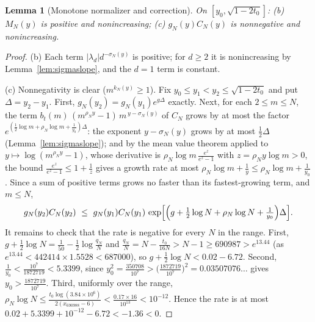 \documentclass[11pt]{article}
\newtheorem{lemma}[theorem]{Lemma}
\theoremstyle{definition}
\begin{document}
\begin{lemma}[Monotone normalizer and correction]\label{lem:bc}
On $[y_0,\sqrt{1-2t_0}]$: \textup{(b)} $M_N(y)$ is positive and
nonincreasing; \textup{(c)} $g_N(y)C_N(y)$ is nonnegative and
nonincreasing.
\end{lemma}

\begin{proof}
(b) Each term $|\lambda_d|d^{-\sigma_N(y)}$ is positive; for
$d\ge2$ it is nonincreasing by Lemma~\ref{lem:sigmaslope}, and the
$d=1$ term is constant.

(c) Nonnegativity is clear ($m^{k_N(y)}\ge1$). Fix
$y_0\le y_1<y_2\le\sqrt{1-2t_0}$ and put $\Delta=y_2-y_1$. First,
$g_N(y_2)=g_N(y_1)e^{g\Delta}$ exactly. Next, for each
$2\le m\le N$, the term
$b_t(m)\,(m^{\rho_Ny}-1)\,m^{\,y-\sigma_N(y)}$ of $C_N$ grows by at
most the factor $e^{(\frac12\log m+\rho_N\log m+\frac1{y_0})\Delta}$:
the exponent $y-\sigma_N(y)$ grows by at most $\frac12\Delta$
(Lemma~\ref{lem:sigmaslope}); and by the mean value theorem applied
to $y\mapsto\log(m^{\rho_Ny}-1)$, whose derivative is
$\rho_N\log m\,\frac{e^z}{e^z-1}$ with $z=\rho_Ny\log m>0$, the
bound $\frac{e^z}{e^z-1}\le1+\frac1z$ gives a growth rate at most
$\rho_N\log m+\frac1{y}\le\rho_N\log m+\frac1{y_0}$. Since a sum of
positive terms grows no faster than its fastest-growing term, and
$m\le N$,
\[
g_N(y_2)C_N(y_2)\ \le\
g_N(y_1)C_N(y_1)\,
\exp\Bigl[\Bigl(g+\tfrac12\log N+\rho_N\log N
+\tfrac1{y_0}\Bigr)\Delta\Bigr].
\]
It remains to check that the rate is negative for every $N$ in the
range. First, $g+\frac12\log N=\frac1{50}-\frac12\log\frac{q_N}N$
and $\frac{q_N}N=N-\frac{t_0}{16N}>N-1\ge690987>e^{13.44}$ (as
$e^{13.44}<442414\times1.5528<687000$), so
$g+\frac12\log N<0.02-6.72$. Second,
$\frac1{y_0}<\frac{10^7}{1872719}<5.3399$, since
$y_0^2=\frac{350708}{10^7}>\bigl(\frac{1872719}{10^7}\bigr)^2
=0.03507076\ldots$ gives $y_0>\frac{1872719}{10^7}$. Third,
uniformly over the range,
$\rho_N\log N\le\frac{t_0\log(3.84\times10^6)}{2(x_{690988}-6)}
<\frac{0.17\times16}{10^{13}}<10^{-12}$. Hence the rate is at most
$0.02+5.3399+10^{-12}-6.72<-1.36<0$.
\end{proof}
\end{document}
